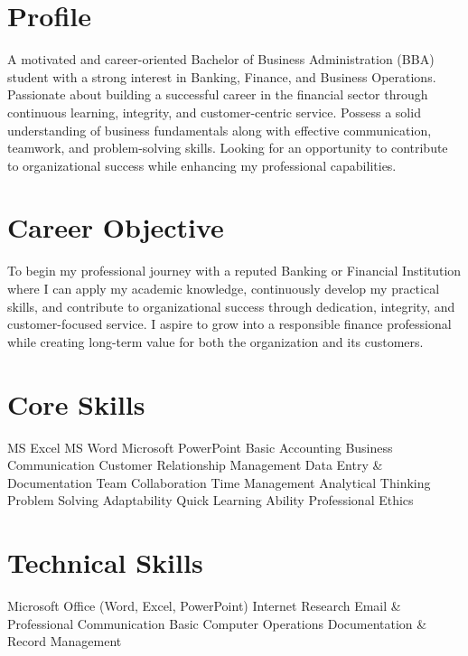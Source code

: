 \documentclass[]{deedy-resume-openfont}
\begin{document}
\begin{minipage}[t]{0.66\textwidth}

\section{Profile}
A motivated and career-oriented Bachelor of Business Administration (BBA)
student with a strong interest in Banking, Finance, and Business Operations.
Passionate about building a successful career in the financial sector through
continuous learning, integrity, and customer-centric service. Possess a solid
understanding of business fundamentals along with effective communication,
teamwork, and problem-solving skills. Looking for an opportunity to contribute
to organizational success while enhancing my professional capabilities.
\sectionsep

\section{Career Objective}
To begin my professional journey with a reputed Banking or Financial
Institution where I can apply my academic knowledge, continuously develop my
practical skills, and contribute to organizational success through dedication,
integrity, and customer-focused service. I aspire to grow into a responsible
finance professional while creating long-term value for both the organization
and its customers.
\sectionsep

\section{Core Skills}
MS Excel \textbullet{} MS Word \textbullet{} Microsoft PowerPoint \textbullet{}
Basic Accounting \textbullet{} Business Communication \textbullet{}
Customer Relationship Management \textbullet{} Data Entry \& Documentation
\textbullet{} Team Collaboration \textbullet{} Time Management \textbullet{}
Analytical Thinking \textbullet{} Problem Solving \textbullet{} Adaptability
\textbullet{} Quick Learning Ability \textbullet{} Professional Ethics
\sectionsep

\section{Technical Skills}
Microsoft Office (Word, Excel, PowerPoint) \textbullet{} Internet Research
\textbullet{} Email \& Professional Communication \textbullet{} Basic Computer
Operations \textbullet{} Documentation \& Record Management
\sectionsep


\end{minipage}
\end{document}
